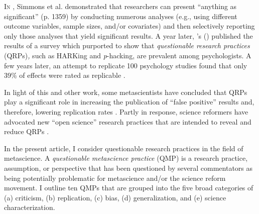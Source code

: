 \documentclass[authordate, meta]{jote-new-article}
\author[1]{Mark Rubin\orcid{0000-0002-6483-8561}}
\affil[1]{Durham University}
\begin{document}
\begin{frontmatter}
  \maketitle
  \begin{abstract}
    \printabstracttext
  \end{abstract}
\end{frontmatter}



\lettrine{I}{n} \citeyear{Simmons2011}, Simmons et al. demonstrated that researchers can present “anything as significant” (p. 1359) by conducting numerous analyses (e.g., using different outcome variables, sample sizes, and/or covariates) and then selectively reporting only those analyses that yield significant results. A year later, \citeauthor{John2012}'s \mbox{(\hspace*{-.21em}\citeyear{John2012})} published the results of a survey which purported to show that \emph{questionable research practices }(QRPs)\emph{, }such as HARKing and \emph{p}-hacking, are prevalent among psychologists. A few years later, an attempt to replicate 100 psychology studies found that only 39\% of effects were rated as replicable \parencite{Collaboration2015}.



In light of this and other work, some metascientists have concluded that QRPs play a significant role in increasing the publication of “false positive” results and, therefore, lowering replication rates \parencites[e.g.,][]{Bishop2019}{Bishop2020}{Munafò2017}{Nosek2012}{Collaboration2015}{Schimmack2020}{Spellman2018}. Partly in response, science reformers have advocated new “open science” research practices that are intended to reveal and reduce QRPs \parencites[e.g., preregistered research plans, publicly accessible research data and materials][]{Munafò2017}.



In the present article, I consider questionable research practices in the field of metascience. A \emph{questionable metascience practice }(QMP) is a research practice, assumption, or perspective that has been questioned by several commentators as being potentially problematic for metascience and/or the science reform movement. I outline ten QMPs that are grouped into the five broad categories of (a) criticism, (b) replication, (c) bias, (d) generalization, and (e) science characterization.
\end{document}
